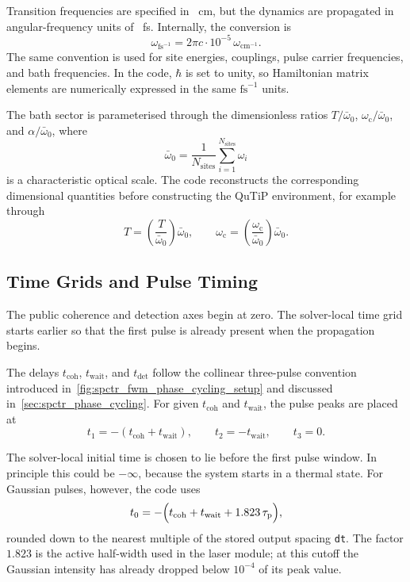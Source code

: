 Transition frequencies are specified in \si{\per\centi\metre}, but the dynamics
are propagated in angular-frequency units of \si{\per\femto\second}. Internally,
the conversion is
\[
\omega_{\mathrm{fs}^{-1}}
=
2\pi c \cdot 10^{-5}\,\omega_{\mathrm{cm}^{-1}}.
\]
The same convention is used for site energies, couplings, pulse carrier
frequencies, and bath frequencies. In the code, \(\hbar\) is set to unity, so
Hamiltonian matrix elements are numerically expressed in the same
\(\mathrm{fs}^{-1}\) units.

The bath sector is parameterised through the dimensionless ratios
\(T/\bar{\omega}_0\), \(\omega_{\mathrm{c}}/\bar{\omega}_0\), and
\(\alpha/\bar{\omega}_0\), where
\[
\bar{\omega}_0
=
\frac{1}{N_{\mathrm{sites}}}
\sum_{i=1}^{N_{\mathrm{sites}}}\omega_i
\]
is a characteristic optical scale. The code reconstructs the corresponding
dimensional quantities before constructing the QuTiP environment, for example
through
\[
T
=
\left(\frac{T}{\bar{\omega}_0}\right)\bar{\omega}_0,
\qquad
\omega_{\mathrm{c}}
=
\left(\frac{\omega_{\mathrm{c}}}{\bar{\omega}_0}\right)\bar{\omega}_0.
\]

\subsection{Time Grids and Pulse Timing}

The public coherence and detection axes begin at zero. The solver-local time
grid starts earlier so that the first pulse is already present when the
propagation begins.

The delays \(t_{\mathrm{coh}}\), \(t_{\mathrm{wait}}\), and
\(t_{\mathrm{det}}\) follow the collinear three-pulse convention introduced
in~\autoref{fig:spctr_fwm_phase_cycling_setup} and discussed
in~\autoref{sec:spctr_phase_cycling}. For given \(t_{\mathrm{coh}}\) and
\(t_{\mathrm{wait}}\), the pulse peaks are placed at
\[
t_1 = -(t_{\mathrm{coh}} + t_{\mathrm{wait}}),
\qquad
t_2 = -t_{\mathrm{wait}},
\qquad
t_3 = 0.
\]

The solver-local initial time is chosen to lie before the first pulse window.
In principle this could be \(-\infty\), because the system starts in a thermal
state. For Gaussian pulses, however, the code uses
\[
t_0
=
-\Bigl(t_{\mathrm{coh}} + t_{\mathrm{wait}} + 1.823\,\tau_{\mathrm{p}}\Bigr),
\]
rounded down to the nearest multiple of the stored output spacing
\texttt{dt}. The factor \(1.823\) is the active half-width used in the laser
module; at this cutoff the Gaussian intensity has already dropped below
\(10^{-4}\) of its peak value.

